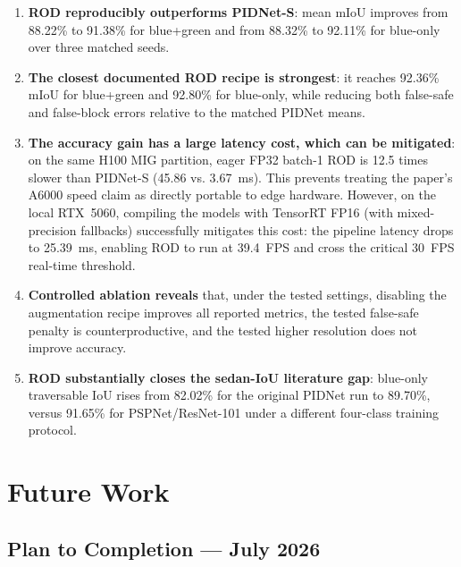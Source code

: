 \documentclass[12pt,a4paper]{report}
\begin{document}
\begin{enumerate}
  \item \textbf{ROD reproducibly outperforms PIDNet-S}: mean mIoU improves
  from 88.22\% to 91.38\% for blue+green and from 88.32\% to 92.11\% for
  blue-only over three matched seeds.

  \item \textbf{The closest documented ROD recipe is strongest}: it reaches
  92.36\% mIoU for blue+green and 92.80\% for blue-only, while reducing both
  false-safe and false-block errors relative to the matched PIDNet means.

  \item \textbf{The accuracy gain has a large latency cost, which can be mitigated}: on the same H100
  MIG partition, eager FP32 batch-1 ROD is 12.5 times slower than PIDNet-S
  (45.86 vs. 3.67~ms). This prevents treating the paper's A6000 speed claim as
  directly portable to edge hardware. However, on the local RTX~5060, compiling the models with TensorRT FP16 (with mixed-precision fallbacks) successfully mitigates this cost: the pipeline latency drops to 25.39~ms, enabling ROD to run at 39.4~FPS and cross the critical 30~FPS real-time threshold.

  \item \textbf{Controlled ablation reveals} that, under the tested settings,
  disabling the augmentation recipe improves all reported metrics, the tested
  false-safe penalty is counterproductive, and the tested higher resolution
  does not improve accuracy.

  \item \textbf{ROD substantially closes the sedan-IoU literature gap}:
  blue-only traversable IoU rises from 82.02\% for the original PIDNet run to
  89.70\%, versus 91.65\% for PSPNet/ResNet-101 under a different four-class
  training protocol.
\end{enumerate}


\chapter{Future Work}
\label{sec:future}

\section{Plan to Completion --- July 2026}
\label{sec:july_plan}
\end{document}
